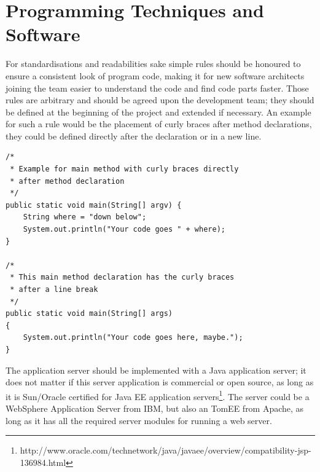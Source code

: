 \documentclass[11pt,a4paper,oneside,svgnames]{report}
\begin{document}
\section{Programming Techniques and Software}
For standardisations and readabilities sake simple rules should be honoured to ensure a consistent look of program code, making it for new software architects joining the team easier to understand the code and find code parts faster. Those rules are arbitrary and should be agreed upon the development team; they should be defined at the beginning of the project and extended if necessary. An example for such a rule would be the placement of curly braces after method declarations, they could be defined directly after the declaration or in a new line.


\begin{lstlisting}[caption={Example of method declaration with curly braces in single and new line},label=javaCodeExampleCurlyBraces]
/*
 * Example for main method with curly braces directly 
 * after method declaration
 */
public static void main(String[] argv) {
	String where = "down below";
	System.out.println("Your code goes " + where);
}

/*
 * This main method declaration has the curly braces 
 * after a line break
 */
public static void main(String[] args)
{
	System.out.println("Your code goes here, maybe.");
}
\end{lstlisting}

The application server should be implemented with a Java application server; it does not matter if this server application is commercial or open source, as long as it is Sun/Oracle certified for Java EE application servers\footnote{http://www.oracle.com/technetwork/java/javaee/overview/compatibility-jsp-136984.html}.
The server could be a WebSphere Application Server from IBM, but also an TomEE from Apache, as long as it has all the required server modules for running a web server.
\end{document}
